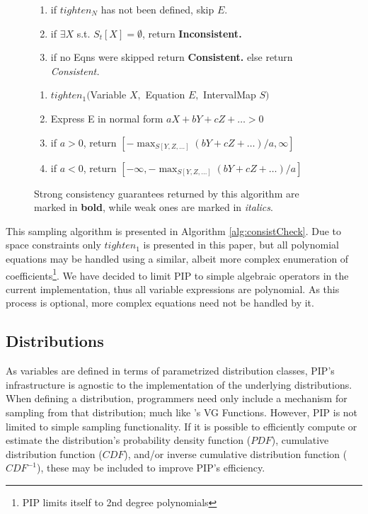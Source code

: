 \begin{figure}
\begin{algorithm}
\begin{enumerate}
\item \hspace*{0.5in} if $tighten_N$ has not been defined, skip $E$.
\item \hspace*{0.3in} if $\exists X$ s.t. $S_{t}[X] = \emptyset$, return \textbf{Inconsistent.}
\item \hspace*{0.1in} if no Eqns were skipped return \textbf{Consistent.} else return \textit{Consistent.}
\end{enumerate}
\begin{enumerate}
\item $tighten_1($Variable $X,$ Equation $E,$ IntervalMap $S)$
\item \hspace*{0.1in} Express E in normal form $aX + bY + cZ + \ldots > 0$
\item \hspace*{0.2in} if $a > 0$, return $[-\max_{S[Y,Z,\ldots]}(bY+cZ+\ldots)/a, \infty]$
\item \hspace*{0.2in} if $a < 0$, return $[-\infty, -\max_{S[Y,Z,\ldots]}(bY+cZ+\ldots)/a]$
\end{enumerate}
\end{algorithm}
{\footnotesize Strong consistency guarantees returned by this algorithm are marked in \textbf{bold}, while weak ones are marked in \textit{italics}.}
\vspace*{-0.2in}
\end{figure}

This sampling algorithm is presented in Algorithm \ref{alg:consistCheck}.  Due to space constraints only $tighten_1$ is presented in this paper, but all polynomial equations may be handled using a similar, albeit more complex enumeration of coefficients\footnote{PIP limits itself to 2nd degree polynomials}.  We have decided to limit PIP to simple algebraic operators in the current implementation, thus all variable expressions are polynomial.  As this process is optional, more complex equations need not be handled by it.

\subsection{Distributions}
As variables are defined in terms of parametrized distribution classes, PIP's infrastructure is agnostic to the implementation of the underlying distributions.  When defining a distribution, programmers need only include a mechanism for sampling from that distribution; much like \cite{MCDB}'s VG Functions.  However, PIP is not limited to simple sampling functionality.  If it is possible to efficiently compute or estimate the distribution's probability density function ($PDF$), cumulative distribution function ($CDF$), and/or inverse cumulative distribution function ($CDF^{-1}$), these may be included to improve PIP's efficiency.  


